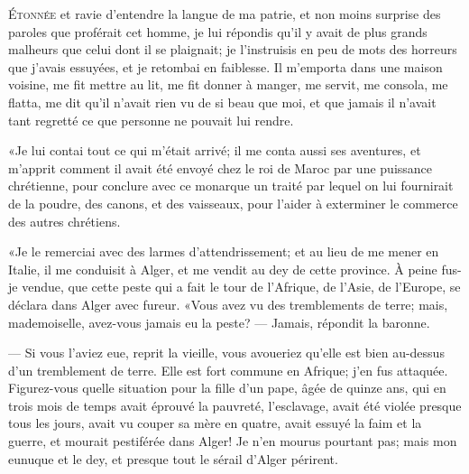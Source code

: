 \lettrine[ante=«]{É}{tonnée} et ravie d’entendre la langue de ma patrie, et non moins
surprise des paroles que proférait cet homme, je lui répondis qu’il y
avait de plus grands malheurs que celui dont il se plaignait; je
l’instruisis en peu de mots des horreurs que j’avais essuyées, et je
retombai en faiblesse. Il m’emporta dans une maison voisine, me fit
mettre au lit, me fit donner à manger, me servit, me consola, me
flatta, me dit qu’il n’avait rien vu de si beau que moi, et que jamais
il n’avait tant regretté ce que personne ne pouvait lui rendre. \localleftbox{}




«Je lui contai tout ce qui m’était arrivé; il me conta aussi ses
aventures, et m’apprit comment il avait été envoyé chez le roi de Maroc
par une puissance chrétienne, pour conclure avec ce monarque un traité
par lequel on lui fournirait de la poudre, des canons, et des
vaisseaux, pour l’aider à exterminer le commerce des autres chrétiens.
\localleftbox{}


«Je le remerciai avec des larmes d’attendrissement; et au lieu de me
mener en Italie, il me conduisit à Alger, et me vendit au dey de cette
province. À peine fus-je vendue, que cette peste qui a fait le tour de
l’Afrique, de l’Asie, de l’Europe, se déclara dans Alger avec fureur.
«Vous avez vu des tremblements de terre; mais, mademoiselle, avez-vous
jamais eu la peste? — Jamais, répondit la baronne.

— Si vous l’aviez eue, reprit la vieille, vous avoueriez qu’elle est bien
au-dessus d’un tremblement de terre. Elle est fort commune en Afrique;
j’en fus attaquée. Figurez-vous quelle situation pour la fille d’un
pape, âgée de quinze ans, qui en trois mois de temps avait éprouvé la
pauvreté, l’esclavage, avait été violée presque tous les jours, avait
vu couper sa mère en quatre, avait essuyé la faim et la guerre, et
mourait pestiférée dans Alger! Je n’en mourus pourtant pas; mais mon
eunuque et le dey, et presque tout le sérail \linebreak d’Alger périrent.



